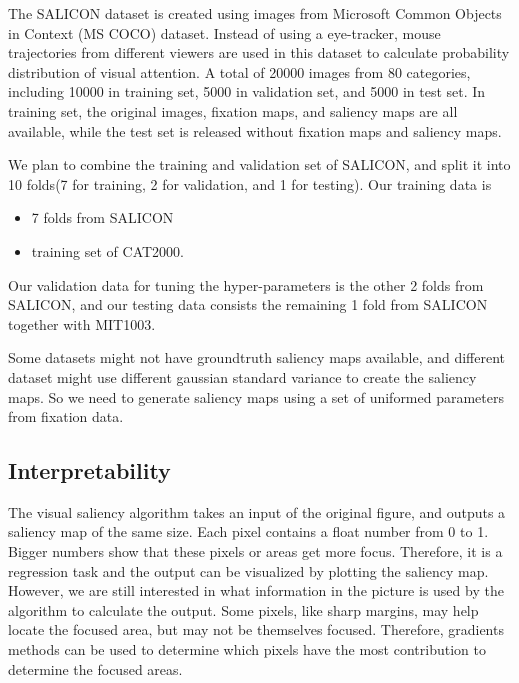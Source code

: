 \documentclass[12pt]{article}
\begin{document}
The SALICON dataset is created using images from Microsoft Common Objects in Context (MS COCO) dataset\cite{linMicrosoftCOCOCommon2015}.
Instead of using a eye-tracker, mouse trajectories from different viewers are used in this dataset 
to calculate probability distribution of visual attention. A total of 20000 images from 80 categories, including
10000 in training set, 5000 in validation set, and 5000 in test set.
In training set, the original images, fixation maps, and saliency maps are all available, while 
the test set is released without fixation maps and saliency maps.


We plan to combine the training and validation set of SALICON, 
and split it into 10 folds(7 for training, 2 for validation, and 1 for testing). 
Our training data is
\begin{itemize}
    \item 7 folds from SALICON
    \item training set of CAT2000.
\end{itemize}
Our validation data for tuning the hyper-parameters is the other 2 folds from SALICON, 
and our testing data consists the remaining 1 fold from SALICON together with MIT1003.

Some datasets might not have groundtruth saliency maps available, and different dataset might use different gaussian standard variance to create the saliency maps.
So we need to generate saliency maps using a set of uniformed parameters from fixation data.


\subsection{Interpretability}

The visual saliency algorithm takes an input of the original figure, and outputs a saliency map of the same size. Each pixel contains a float number from 0 to 1. Bigger numbers show that these pixels or areas get more focus. Therefore, it is a regression task and the output can be visualized by plotting the saliency map.
However, we are still interested in what information in the picture is used by the algorithm to calculate the output. Some pixels, like sharp margins, may help locate the focused area, but may not be themselves focused.
Therefore, gradients methods \cite{sundararajan2017axiomatic} can be used to determine which pixels have the most contribution to determine the focused areas.
\end{document}
